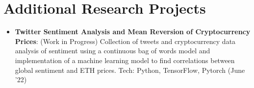 \documentclass[a4paper,20pt]{article}
\makeatletter
\newcommand{\resumeItem}[2]{
  \item\small{
    \textbf{#1}{: #2 \vspace{-2pt}}
  }
}
\newcommand{\resumeSubheading}[4]{
  \vspace{-1pt}\item
    \begin{tabular*}{0.97\textwidth}{l@{\extracolsep{\fill}}r}
      \textbf{#1} & #2 \\
      \textit{#3} & \textit{#4} \\
    \end{tabular*}\vspace{-5pt}
}
\newcommand{\resumeSubItem}[2]{\resumeItem{#1}{#2}\vspace{-3pt}}
\newcommand{\resumeSubHeadingListStart}{\begin{itemize}[leftmargin=*]}
\newcommand{\resumeSubHeadingListEnd}{\end{itemize}}
\makeatother
\begin{document}
\section{Additional Research Projects}
\resumeSubHeadingListStart
\resumeSubItem{Twitter Sentiment Analysis and Mean Reversion of Cryptocurrency Prices}{(Work in Progress) Collection of tweets and cryptocurrency data analysis of sentiment using a continuous bag of words model and implementation of a machine learning model to find correlations between global sentiment and ETH prices. Tech: Python, TensorFlow, Pytorch (June '22)}
\resumeSubHeadingListEnd
\vspace{-5pt}
\end{document}
